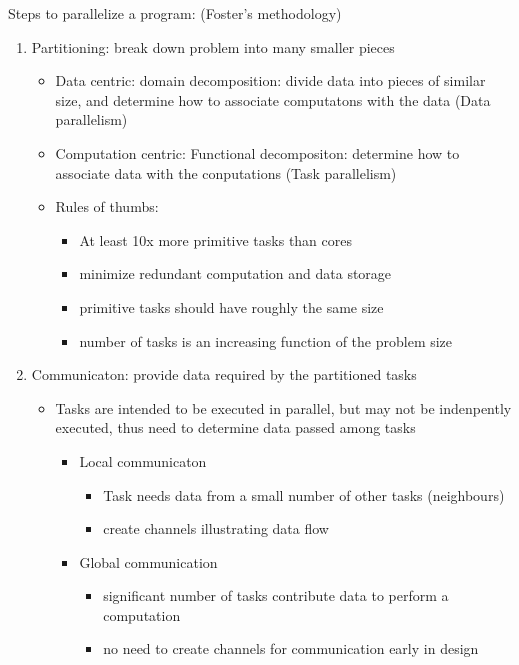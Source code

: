 \documentclass{article}
\begin{document}
Steps to parallelize a program: (Foster's methodology)
\begin{enumerate}
    \item Partitioning: break down problem into many smaller pieces
    \begin{itemize}
        \item Data centric: domain decomposition: divide data into pieces of similar size, and determine how to associate computatons with the data (Data parallelism)
        \item Computation centric: Functional decompositon: determine how to associate data with the conputations (Task parallelism)
        \item Rules of thumbs:
        \begin{itemize}
            \item At least 10x more primitive tasks than cores 
            \item minimize redundant computation and data storage
            \item primitive tasks should have roughly the same size
            \item number of tasks is an increasing function of the problem size
        \end{itemize}
    \end{itemize}
    \item Communicaton: provide data required by the partitioned tasks
    \begin{itemize}
        \item Tasks are intended to be executed in parallel, but may not be indenpently executed, thus need to determine data passed among tasks
        \begin{itemize}
            \item Local communicaton
            \begin{itemize}
                \item Task needs data from a small number of other tasks (neighbours)
                \item create channels illustrating data flow
            \end{itemize}
            \item Global communication
            \begin{itemize}
                \item significant number of tasks contribute data to perform a computation 
                \item no need to create channels for communication early in design

\end{itemize}
\end{itemize}
\end{itemize}
\end{enumerate}
\end{document}
